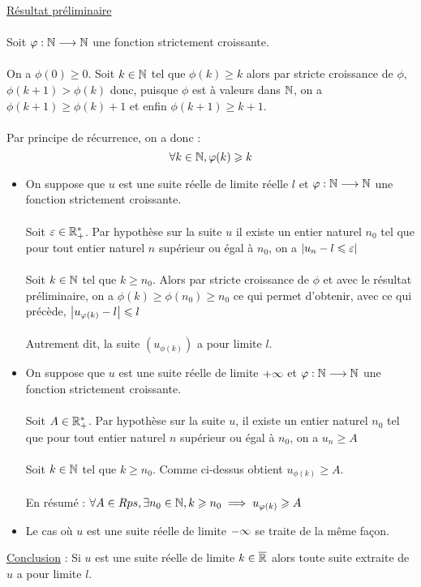 \begin{dem}
    \underline{Résultat préliminaire}\\~\\
    Soit \(\varphi : \mathbb{N} \longrightarrow \mathbb{N}\) une fonction strictement croissante.\\~\\
    On a \(\phi(0)\geq 0\). Soit \(k \in \mathbb{N}\) tel que \(\phi(k)\geq k\) alors par stricte croissance de \(\phi\), \(\phi(k+1)>\phi(k)\) donc, puisque \(\phi\) est à valeurs dans \(\mathbb{N}\), on a \(\phi(k+1)\geq \phi(k)+1\) et enfin \(\phi(k +1) \geq k+1\).\\~\\
    Par principe de récurrence, on a donc : \[\forall k \in \mathbb{N}, \varphi(k)\geqslant k\]
    \begin{itemize}
        \item On suppose que \(u\) est une suite réelle de limite réelle \(l\) et \(\varphi : \mathbb{N} \longrightarrow \mathbb{N}\) une fonction strictement croissante.\\~\\
        Soit \(\varepsilon\in \mathbb{R}_+^*\). Par hypothèse  sur la suite \(u\) il existe un entier naturel \(n_0\) tel que pour tout entier naturel \(n\) supérieur ou égal à \(n_0\), on a \(\left\lvert u_n - l \leqslant \varepsilon\right\rvert\)\\~\\
        Soit \(k \in \mathbb{N}\) tel que \(k \geq n_0\). Alors par stricte croissance de \(\phi\) et avec le résultat préliminaire, on a \(\phi(k)\geq \phi(n_0)\geq n_0\) ce qui permet d'obtenir, avec ce qui précède, \(\left\lvert u_{\varphi(k)}-l\right\rvert\leqslant l\)\\~\\
        Autrement dit, la suite \((u_{\phi(k)})\) a pour limite \(l\).
        \item On suppose que \(u\) est une suite réelle de limite \(+\infty\) et \(\varphi : \mathbb{N} \longrightarrow \mathbb{N}\) une fonction strictement croissante.\\~\\
        Soit \(A \in \mathbb{R}_+^*\). Par hypothèse sur la suite \(u\), il existe un entier naturel \(n_0\) tel que pour tout entier naturel \(n\) supérieur ou égal à \(n_0\), on a \(u_n \geq A\)\\~\\
        Soit \(k \in \mathbb{N}\) tel que \(k \geq n_0\). Comme ci-dessus obtient \(u_{\phi(k)}\geq A\).\\~\\
        En résumé : \(\forall A \in Rps, \exists n_0 \in \mathbb{N}, k \geqslant n_0 \implies u_{\varphi(k)}\geqslant A\)
        \item Le cas où \(u\) est une suite réelle de limite \(-\infty\) se traite de la même façon.
    \end{itemize}
    \underline{Conclusion} : Si \(u\) est une suite réelle de limite \(k \in \overline{\mathbb{R}}\) alors toute suite extraite de \(u\) a pour limite \(l\).
\end{dem}

